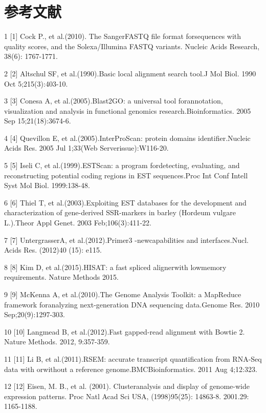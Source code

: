 \documentclass[10pt,oneside,a4paper]{article}	%
\begin{document}
\section{参考文献}
\begin{tablenotes}
\item[1] {[1] Cock P., et al.(2010). The SangerFASTQ file format forsequences with quality scores, and the Solexa/Illumina FASTQ variants. Nucleic Acids Research, 38(6): 1767-1771.}
\item[2] {[2] Altschul SF, et al.(1990).Basic local alignment search tool.J Mol Biol. 1990 Oct 5;215(3):403-10.}
\item[3] {[3] Conesa A, et al.(2005).Blast2GO: a universal tool forannotation, visualization and analysis in functional genomics research.Bioinformatics. 2005 Sep 15;21(18):3674-6.}
\item[4] {[4] Quevillon E, et al.(2005).InterProScan: protein domains identifier.Nucleic Acids Res. 2005 Jul 1;33(Web Serverissue):W116-20.}
\item[5] {[5] Iseli C, et al.(1999).ESTScan: a program fordetecting, evaluating, and reconstructing potential coding regions in EST sequences.Proc Int Conf Intell Syst Mol Biol. 1999:138-48.}
\item[6] {[6] Thiel T, et al.(2003).Exploiting EST databases for the development and characterization of gene-derived SSR-markers in barley (Hordeum vulgare L.).Theor Appl Genet. 2003
Feb;106(3):411-22.}
\item[7] {[7] UntergrasserA, et al.(2012).Primer3 -newcapabilities and interfaces.Nucl. Acids Res. (2012)40 (15): e115.}
\item[8] {[8] Kim D, et al.(2015).HISAT: a fast spliced alignerwith lowmemory requirements. Nature Methods 2015.}
\item[9] {[9] McKenna A, et al.(2010).The Genome Analysis Toolkit: a MapReduce framework foranalyzing next-generation DNA sequencing data.Genome Res. 2010 Sep;20(9):1297-303.}
\item[10] {[10] Langmead B, et al.(2012).Fast gapped-read alignment with Bowtie 2. Nature Methods. 2012, 9:357-359.}
\item[11] {[11] Li B, et al.(2011).RSEM: accurate transcript quantification from RNA-Seq data with orwithout a reference genome.BMCBioinformatics. 2011 Aug 4;12:323.}
\item[12] {[12] Eisen, M. B., et al. (2001). Clusteranalysis and display of genome-wide expression patterns. Proc Natl Acad Sci USA, (1998)95(25): 14863-8. 2001.29: 1165-1188.}

\end{tablenotes}
\end{document}
